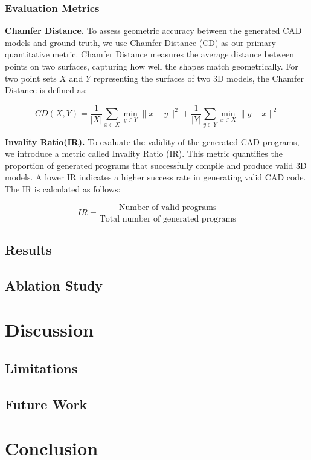 \documentclass[doubleblind]{ecai}
\begin{document}
\subsubsection{Evaluation Metrics}

\textbf{Chamfer Distance.} To assess geometric accuracy between the generated CAD models and ground truth, we use Chamfer Distance (CD) as our primary quantitative metric. Chamfer Distance measures the average distance between points on two surfaces, capturing how well the shapes match geometrically. For two point sets $X$ and $Y$ representing the surfaces of two 3D models, the Chamfer Distance is defined as:

$$CD(X, Y) = \frac{1}{|X|} \sum_{x \in X} \min_{y \in Y} \|x - y\|^2 + \frac{1}{|Y|} \sum_{y \in Y} \min_{x \in X} \|y - x\|^2$$

\textbf{Invality Ratio(IR).} To evaluate the validity of the generated CAD programs, we introduce a metric called Invality Ratio (IR). This metric quantifies the proportion of generated programs that successfully compile and produce valid 3D models. A lower IR indicates a higher success rate in generating valid CAD code. The IR is calculated as follows:

$$IR = \frac{\text{Number of valid programs}}{\text{Total number of generated programs}}$$


\subsection{Results}

\subsection{Ablation Study}


\section{Discussion}

\subsection{Limitations}

\subsection{Future Work}

\section{Conclusion}



\end{document}
